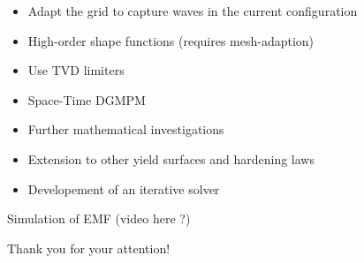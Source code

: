 \documentclass[11pt,aspectratio=169]{beamer}
\begin{document}
\begin{frame}[standout]{}
  \begin{footnotesize}
    \begin{block}{}
      \begin{itemize}
      \item[] Adapt the grid to capture waves in the current configuration
      \item[] High-order shape functions (requires mesh-adaption)
      \item[] Use TVD limiters
      \item[] Space-Time DGMPM
      \end{itemize}
    \end{block}

    
    \begin{block}{}
      \begin{itemize}
      \item[] Further mathematical investigations
      \item[] Extension to other yield surfaces and hardening laws
      \item[] Developement of an iterative solver
      \end{itemize}
    \end{block}
  \end{footnotesize}
Simulation of EMF (video here ?)
\end{frame}

\begin{frame}[standout]{}
  Thank you for your attention!
\end{frame}

\appendix


\end{document}
